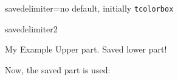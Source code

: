 \begin{docTcbKey}{savedelimiter}{=}{no default, initially \texttt{tcolorbox}}
\begin{exdispExample}{savedelimiter2}
\begin{mybox}{My Example}
Upper part.
\tcblower
Saved lower part!
\end{mybox}

Now, the saved part is used:
\begin{tcolorbox}[colback=green!5]

\end{tcolorbox}
\end{exdispExample}
\end{docTcbKey}